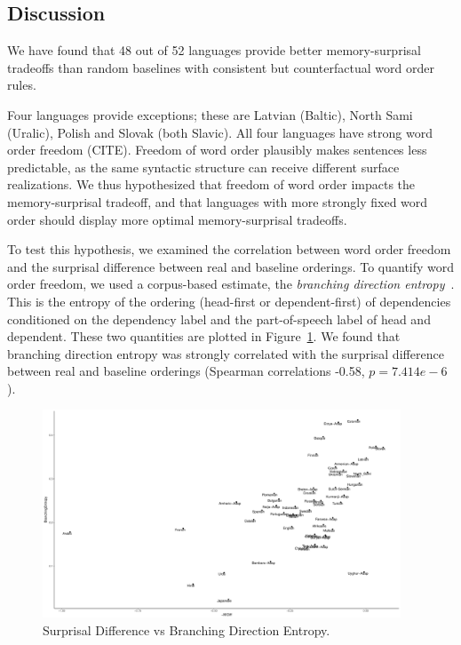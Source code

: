 \documentclass[11pt,letterpaper]{article}
\begin{document}
\subsection{Discussion}

We have found that 48 out of 52 languages provide better memory-surprisal tradeoffs than random baselines with consistent but counterfactual word order rules.

Four languages provide exceptions; these are Latvian (Baltic), North Sami (Uralic), Polish and Slovak (both Slavic).
All four languages have strong word order freedom (CITE).
Freedom of word order plausibly makes sentences less predictable, as the same syntactic structure can receive different surface realizations.
We thus hypothesized that freedom of word order impacts the memory-surprisal tradeoff, and that languages with more strongly fixed word order should display more optimal memory-surprisal tradeoffs.

To test this hypothesis, we examined the correlation between word order freedom and the surprisal difference between real and baseline orderings.
To quantify word order freedom, we used a corpus-based estimate, the \emph{branching direction entropy}~\citep{futrell-quantifying-2015}.
This is the entropy of the ordering (head-first or dependent-first) of dependencies conditioned on the dependency label and the part-of-speech label of head and dependent.
These two quantities are plotted in Figure~\ref{fig:hist-real}.
We found that branching direction entropy was strongly correlated with the surprisal difference between real and baseline orderings (Spearman correlations -0.58, $p = 7.414e-6$).



\begin{figure}
\includegraphics[width=0.95\textwidth]{neural/figures/surprisal-branching-entropy-REAL.pdf}
	\caption{Surprisal Difference vs Branching Direction Entropy.}\label{fig:hist-real}
\end{figure}
\end{document}
